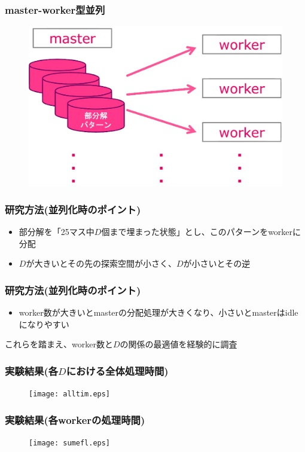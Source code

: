 \documentclass[dvipdfmx,20pt,notheorems,t]{beamer}
\begin{document}
\begin{frame}\frametitle{master-worker型並列}
\begin{figure}[htb]
\centering
\includegraphics[height=0.8\textheight]{real-master-worker.eps}
\end{figure}
\end{frame}

\begin{frame}\frametitle{研究方法(並列化時のポイント)}
\begin{itemize}
\item 部分解を「25マス中$D$個まで埋まった状態」とし、このパターンをworkerに分配
\item $D$が大きいとその先の探索空間が小さく、$D$が小さいとその逆
\end{itemize}
\end{frame}

\begin{frame}\frametitle{研究方法(並列化時のポイント)}
\begin{itemize}
\item worker数が大きいとmasterの分配処理が大きくなり、小さいとmasterはidleになりやすい
\end{itemize}
これらを踏まえ、worker数と$D$の関係の最適値を経験的に調査
\end{frame}

\begin{frame}\frametitle{実験結果(各$D$における全体処理時間)}
\begin{figure}[htb]
\centering
\texttt{[image: alltim.eps]}
\end{figure}
\end{frame}

\begin{frame}\frametitle{実験結果(各workerの処理時間)}
\begin{figure}[htb]
\centering
\texttt{[image: sumefl.eps]}
\end{figure}
\end{frame}
\end{document}
